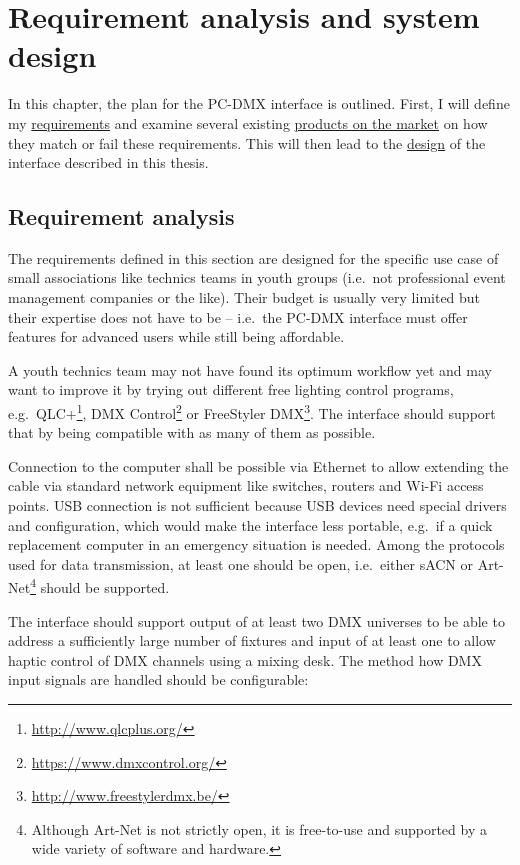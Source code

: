 \cleardoublepage\hypertarget{sec:system-design}{\chapter{Requirement analysis and system
design}\label{sec:system-design}}

In this chapter, the plan for the PC-DMX interface is outlined. First, I
will define my \protect\hyperlink{sec:requirements}{requirements} and
examine several existing \protect\hyperlink{sec:market-study}{products
on the market} on how they match or fail these requirements. This will
then lead to the \protect\hyperlink{sec:design}{design} of the interface
described in this thesis.

\hypertarget{sec:requirements}{\section{Requirement
analysis}\label{sec:requirements}}

The requirements defined in this section are designed for the specific
use case of small associations like technics teams in youth groups
(i.e.~not professional event management companies or the like). Their
budget is usually very limited but their expertise does not have to be
-- i.e.~the PC-DMX interface must offer features for advanced users
while still being affordable.

A youth technics team may not have found its optimum workflow yet and
may want to improve it by trying out different free lighting control
programs, e.g.~QLC+\footnote{\url{http://www.qlcplus.org/}}, DMX
Control\footnote{\url{https://www.dmxcontrol.org/}} or FreeStyler
DMX\footnote{\url{http://www.freestylerdmx.be/}}. The interface should
support that by being compatible with as many of them as possible.

Connection to the computer shall be possible via Ethernet to allow
extending the cable via standard network equipment like switches,
routers and Wi-Fi access points. USB connection is not sufficient
because USB devices need special drivers and configuration, which would
make the interface less portable, e.g.~if a quick replacement computer
in an emergency situation is needed. Among the protocols used for data
transmission, at least one should be open, i.e.~either sACN or
Art-Net\footnote{Although Art-Net is not strictly open, it is
  free-to-use and supported by a wide variety of software and hardware.}
should be supported.

The interface should support output of at least two DMX universes to be
able to address a sufficiently large number of fixtures and input of at
least one to allow haptic control of DMX channels using a mixing desk.
The method how DMX input signals are handled should be configurable:

